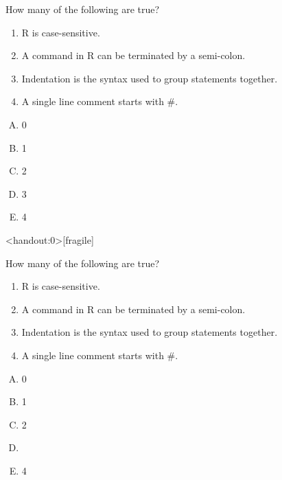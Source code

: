 \documentclass[xcolor=svgnames, 10pt]{beamer}
\begin{document}
\begin{frame}[fragile]
\begin{question}
How many of the following are true?
\begin{enumerate}
\item R is case-sensitive.
\item A command in R can be terminated by a semi-colon. 
\item Indentation is the syntax used to group statements together. 
\item A single line comment starts with \#. 
\end{enumerate}
\begin{multicols}{5}
\begin{enumerate}[A)]
\item 0
\item 1
\item 2
\item 3
\item 4
\end{enumerate}
\end{multicols}
\end{question}
\end{frame}


\begin{frame}<handout:0>[fragile]
\begin{question}
How many of the following are true?
\begin{enumerate}
\item R is case-sensitive. \onslide<+->\pcmark
\item A command in R can be terminated by a semi-colon. \pcmark
\item Indentation is the syntax used to group statements together. \pxmark
\item A single line comment starts with \#. \pcmark
\end{enumerate}
\begin{multicols}{5}
\begin{enumerate}[A)]
\item 0
\item 1
\item 2
\item {}
\item 4
\end{enumerate}
\end{multicols}
\end{question}
\end{frame}
\end{document}
